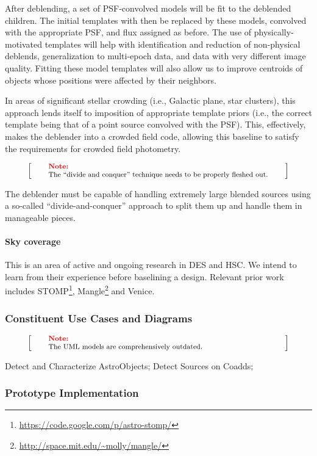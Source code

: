 \documentclass[12pt]{article}
\newenvironment{note}[1][Note]
{
  \begin{displaymath}
    \left[ \qquad
    \begin{minipage}[h]{.75\linewidth}
      \color{red} \footnotesize
      \textbf{#1:} \newline
      \color{black}
}
{
    \end{minipage}
    \normalsize
    \qquad \right]
  \end{displaymath}
}
\begin{document}
After deblending, a set of PSF-convolved models will be fit to the deblended children. The initial templates with then be replaced by these models, convolved with the appropriate PSF, and flux assigned as before. The use of physically-motivated templates will help with identification and reduction of non-physical deblends, generalization to multi-epoch data, and data with very different image quality.  Fitting these model templates will also allow us to improve centroids of objects whose positions were affected by their neighbors. %

In areas of significant stellar crowding (i.e., Galactic plane, star clusters), this approach lends itself to imposition of appropriate template priors (i.e., the correct template being that of a point source convolved with the PSF). This, effectively, makes the deblender into a crowded field code, allowing this baseline to satisfy the requirements for crowded field photometry.

\begin{note}
The ``divide and conquer'' technique needs to be properly fleshed out.
\end{note}

The deblender must be capable of handling extremely large blended sources using a so-called ``divide-and-conquer'' approach to split them up and handle them in manageable pieces.

\paragraph{Sky coverage}

This is an area of active and ongoing research in DES and HSC\@. We intend to learn from their experience before baselining a design. Relevant prior work includes STOMP\footnote{\url{https://code.google.com/p/astro-stomp/}}, Mangle\footnote{\url{http://space.mit.edu/~molly/mangle/}} and Venice.

\subsubsection{Constituent Use Cases and Diagrams}

\begin{note}
The UML models are comprehensively outdated.
\end{note}

Detect and Characterize AstroObjects;
Detect Sources on Coadds;

\subsubsection{Prototype Implementation}
\end{document}

